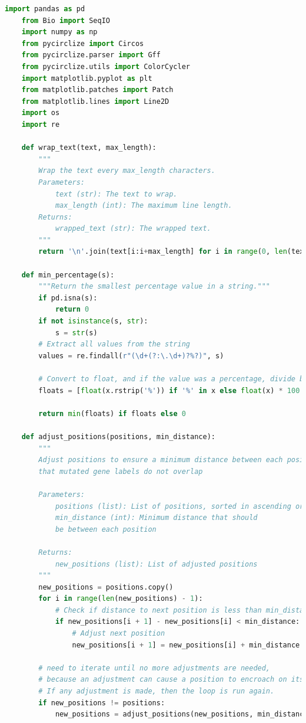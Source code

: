 \documentclass[12pt]{article}
\begin{document}
\begin{lstlisting}[language=Python]
    import pandas as pd
    from Bio import SeqIO
    import numpy as np
    from pycirclize import Circos
    from pycirclize.parser import Gff
    from pycirclize.utils import ColorCycler
    import matplotlib.pyplot as plt
    from matplotlib.patches import Patch
    from matplotlib.lines import Line2D
    import os
    import re
        
    def wrap_text(text, max_length):
        """
        Wrap the text every max_length characters.
        Parameters:
            text (str): The text to wrap.
            max_length (int): The maximum line length.
        Returns:
            wrapped_text (str): The wrapped text.
        """
        return '\n'.join(text[i:i+max_length] for i in range(0, len(text), max_length))

    def min_percentage(s):
        """Return the smallest percentage value in a string."""
        if pd.isna(s):
            return 0
        if not isinstance(s, str):
            s = str(s)
        # Extract all values from the string
        values = re.findall(r"(\d+(?:\.\d+)?%?)", s)
        
        # Convert to float, and if the value was a percentage, divide by 100
        floats = [float(x.rstrip('%')) if '%' in x else float(x) * 100 for x in values]
        
        return min(floats) if floats else 0

    def adjust_positions(positions, min_distance):
        """
        Adjust positions to ensure a minimum distance between each position so 
        that mutated gene labels do not overlap

        Parameters:
            positions (list): List of positions, sorted in ascending order
            min_distance (int): Minimum distance that should 
            be between each position

        Returns:
            new_positions (list): List of adjusted positions
        """
        new_positions = positions.copy()
        for i in range(len(new_positions) - 1):
            # Check if distance to next position is less than min_distance
            if new_positions[i + 1] - new_positions[i] < min_distance:
                # Adjust next position
                new_positions[i + 1] = new_positions[i] + min_distance

        # need to iterate until no more adjustments are needed,
        # because an adjustment can cause a position to encroach on its next neighbor.
        # If any adjustment is made, then the loop is run again.
        if new_positions != positions:
            new_positions = adjust_positions(new_positions, min_distance)


\end{lstlisting}
\end{document}
